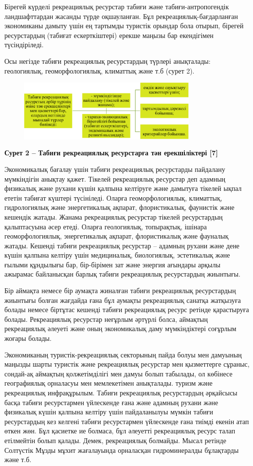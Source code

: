 Бірегей күрделі рекреациялық ресурстар табиғи және табиғи-антропогендік
ландшафттардан жасанды түрде оқшауланған. Бұл рекреациялық-бағдарланған
экономиканы дамыту үшін ең тартымды туристік орындар бола отырып,
бірегей ресурстардың (табиғат ескерткіштері) ерекше маңызы бар
екендігімен түсіндіріледі.

Осы негізде табиғи рекреациялық ресурстардың түрлері анықталады:
геологиялық, геоморфологиялық, климаттық және т.б (сурет 2).

\begin{figure}[H]
	\centering
	\includegraphics[width=0.8\textwidth]{assets/1112}
	\caption*{}
\end{figure}

{\bfseries Сурет 2 -- Табиғи рекреациялық ресурстарға тән ерекшіліктері
{[}7{]}}

Экономикалық бағалау үшін табиғи рекреациялық ресурстарды пайдалану
мүмкіндігін анықтау қажет. Тікелей рекреациялық ресурстар деп адамның
физикалық және рухани күшін қалпына келтіруге және дамытуға тікелей
ықпал ететін табиғат күштері түсініледі. Оларға геоморфологиялық,
климаттық, гидрологиялық және энергетикалық ақпарат, флористикалық,
фаунистік және кешендік жатады. Жанама рекреациялық ресурстар тікелей
ресурстардың қалыптасуына әсер етеді. Оларға геологиялық, топырақтық,
ішінара геоморфологиялық, энергетикалық ақпарат, флористикалық және
фауналық жатады. Кешенді табиғи рекреациялық ресурстар -- адамның рухани
және дене күшін қалпына келтіру үшін медициналық, биологиялық,
эстетикалық және ғылыми құндылығы бар, бір-бірімен зат және энергия
ағындары арқылы ажырамас байланысқан барлық табиғи рекреациялық
ресурстардың жиынтығы.

Бір аймақта немесе бір аумақта жиналған табиғи рекреациялық ресурстардың
жиынтығы болған жағдайда ғана бұл аумақты рекреациялық санатқа жатқызуға
болады немесе біртұтас кешенді табиғи рекреациялық ресурс ретінде
қарастыруға болады. Рекреациялық ресурстар неғұрлым әртүрлі болса,
аймақтың рекреациялық әлеуеті және оның экономикалық даму мүмкіндіктері
соғұрлым жоғары болады.

Экономиканың туристік-рекреациялық секторының пайда болуы мен дамуының
маңызды шарты туристік және рекреациялық ресурстар мен қызметтерге
сұраныс, сондай-ақ аймақтың қолжетімділігі мен дамуы болып табылады, ол
көбінесе географиялық орналасуы мен мемлекетімен анықталады. туризм және
рекреациялық инфрақұрылым. Табиғи рекреациялық ресурстардың әрқайсысы
басқа табиғи ресурстармен үйлескенде ғана және адамның рухани және
физикалық күшін қалпына келтіру үшін пайдаланылуы мүмкін табиғи
ресурстардың кез келгені табиғи ресурстармен үйлескенде ғана тиімді
екенін атап өткен жөн. Бұл қасиетке ие болмаса, бұл әлеуетті
рекреациялық ресурс талап етілмейтін болып қалады. Демек, рекреациялық
болмайды. Мысал ретінде Солтүстік Мұзды мұхит жағалауында орналасқан
гидроминералды бұлақтарды және т.б.

